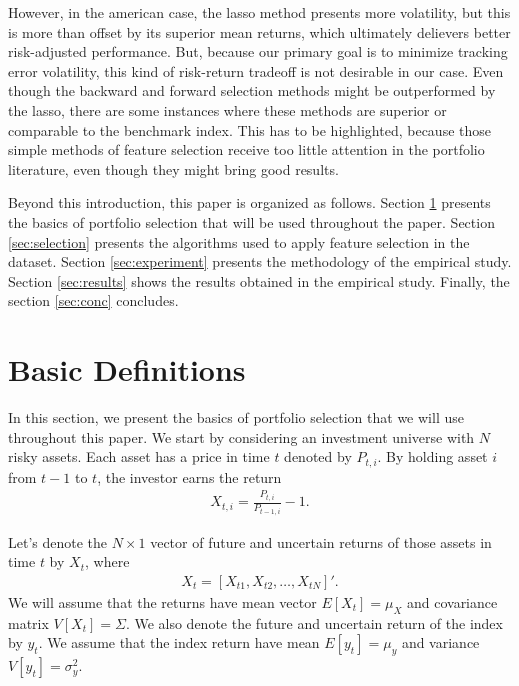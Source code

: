\documentclass[preprint,authoryear,review,12pt]{elsarticle}
\begin{document}
However, in the american case, the lasso method presents more volatility, but this is more than offset by its superior mean returns, which ultimately delievers better risk-adjusted performance.
But, because our primary goal is to minimize tracking error volatility, this kind of risk-return tradeoff is not desirable in our case.
Even though the backward and forward selection methods might be outperformed by the lasso, there are some instances where these methods are superior or comparable to the benchmark index. 
This has to be highlighted, because those simple methods of feature selection receive too little attention in the portfolio literature, even though they might bring good results.


Beyond this introduction, this paper is organized as follows.
Section \ref{sec:defs} presents the basics of portfolio selection that will be used throughout the paper.
Section \ref{sec:selection} presents the algorithms used to apply feature selection in the dataset.
Section \ref{sec:experiment} presents the methodology of the empirical study.
Section \ref{sec:results} shows the results obtained in the empirical study.
Finally, the section \ref{sec:conc} concludes.

\section{Basic Definitions} \label{sec:defs}

In this section, we present the basics of portfolio selection that we will use throughout this paper.
We start by considering an investment universe with $N$ risky assets.
Each asset has a price in time $t$ denoted by $P_{t,i}$.
By holding asset $i$ from $t-1$ to $t$, the investor earns the return
\begin{align} \label{eq:ret}
	X_{t,i} = \frac{P_{t,i}}{P_{t-1,i}} - 1.
\end{align}

Let's  denote the $N\times1$ vector of future and uncertain returns of those assets in time $t$ by $X_{t}$, where 
\begin{align*} %
	X_{t} =  [X_{t1}, X_{t2} , \dots, X_{tN}]'.
\end{align*}
We will assume that the returns have mean vector $E[X_{t}] =\mu_{X}$ and covariance matrix $V[X_{t}] =\Sigma$.
We also denote the future and uncertain return of the index by $y_{t}$.
We assume that the index return have mean $E[y_{t}] = \mu_{y}$ and variance $V[y_{t}]=\sigma^2_{y}$.
\end{document}
